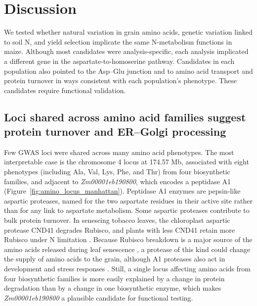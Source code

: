 \documentclass[namedate,unnumsec,webpdf,contemporary,large]{oup-authoring-template}
\begin{document}
\section{Discussion}

We tested whether natural variation in grain amino acids, genetic variation linked to soil N, and yield selection implicate the same N-metabolism functions in maize. Although most candidates were analysis-specific, each analysis implicated a different gene in the aspartate-to-homoserine pathway. Candidates in each population also pointed to the Asp--Glu junction and to amino acid transport and protein turnover in ways consistent with each population's phenotype. These candidates require functional validation.

\subsection{Loci shared across amino acid families suggest protein turnover and ER--Golgi processing}

Few GWAS loci were shared across many amino acid phenotypes. The most interpretable case is the chromosome 4 locus at 174.57 Mb, associated with eight phenotypes (including Ala, Val, Lys, Phe, and Thr) from four biosynthetic families, and adjacent to \textit{Zm00001eb190800}, which encodes a peptidase A1 (Figure~\ref{fig:amino_locus_manhattan}). Peptidase A1 enzymes are pepsin-like aspartic proteases, named for the two aspartate residues in their active site rather than for any link to aspartate metabolism. Some aspartic proteases contribute to bulk protein turnover. In senescing tobacco leaves, the chloroplast aspartic protease CND41 degrades Rubisco, and plants with less CND41 retain more Rubisco under N limitation \citep{Kato2004CND41}. Because Rubisco breakdown is a major source of the amino acids released during leaf senescence \citep{Feller2008Rubiscolytics}, a protease of this kind could change the supply of amino acids to the grain, although A1 proteases also act in development and stress responses \citep{Soares2019AtypicalAP}. Still, a single locus affecting amino acids from four biosynthetic families is more easily explained by a change in protein degradation than by a change in one biosynthetic enzyme, which makes \textit{Zm00001eb190800} a plausible candidate for functional testing.
\end{document}
